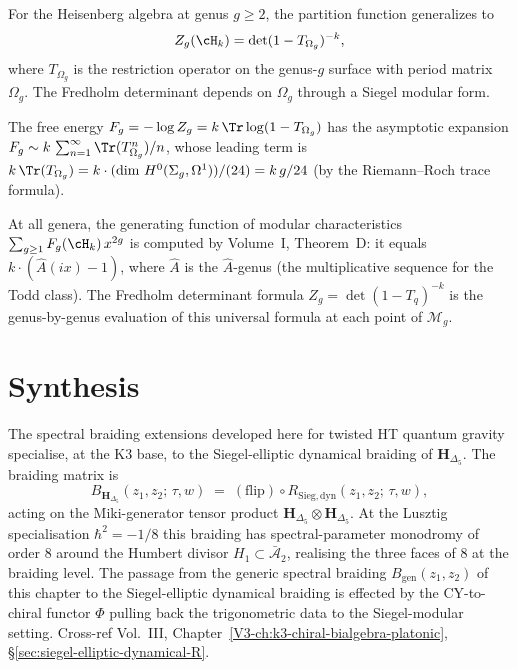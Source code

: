 \begin{remark}
For the Heisenberg algebra at genus $g \ge 2$, the partition function
generalizes to
\[
Z_g(\cH_k) = \det(1 - T_{\Omega_g})^{-k},
\]
where $T_{\Omega_g}$ is the restriction operator on the genus-$g$
surface with period matrix $\Omega_g$. The Fredholm determinant
depends on $\Omega_g$ through a Siegel modular form.

The free energy $F_g = -\log Z_g = k\, \Tr\log(1 - T_{\Omega_g})$
has the asymptotic expansion
$F_g \sim k\, \sum_{n=1}^\infty \Tr(T_{\Omega_g}^n)/n$,
whose leading term is $k\, \Tr(T_{\Omega_g}) = k \cdot
(\text{dim }H^0(\Sigma_g, \Omega^1))/(24) = k\,g/24$
(by the Riemann--Roch trace formula).

At all genera, the generating function of modular characteristics
$\sum_{g \ge 1} F_g(\cH_k)\, x^{2g}$ is computed by
Volume~I, Theorem~D: it equals $k \cdot (\hat{A}(ix) - 1)$,
where $\hat{A}$ is the $\hat{A}$-genus (the multiplicative
sequence for the Todd class). The Fredholm determinant formula
$Z_g = \det(1-T_q)^{-k}$ is the genus-by-genus evaluation of
this universal formula at each point of $\mathcal{M}_g$.
\end{remark}

\section{Synthesis}
\label{sec:specbraid-ext-supplement}

\begin{remark}
\label{rem:specbraid-ext-1}
The spectral braiding extensions developed here for twisted HT quantum
gravity specialise, at the K3 base, to the Siegel-elliptic
dynamical braiding of $\mathbf H_{\Delta_5}$. The braiding matrix is
\[
B_{\mathbf H_{\Delta_5}}(z_1, z_2;\, \tau, w) \;=\; (\mathrm{flip}) \circ R_{\mathrm{Sieg,dyn}}(z_1, z_2;\, \tau, w),
\]
acting on the Miki-generator tensor product
$\mathbf H_{\Delta_5}\otimes\mathbf H_{\Delta_5}$. At the Lusztig
specialisation $\hbar^2 = -1/8$ this braiding has spectral-parameter
monodromy of order $8$ around the Humbert divisor $H_1\subset\bar{\mathcal A}_2$,
realising the three faces of $8$ at the braiding level. The passage from
the generic spectral braiding $B_{\mathrm{gen}}(z_1,z_2)$ of this chapter
to the Siegel-elliptic dynamical braiding is effected by the
CY-to-chiral functor $\Phi$ pulling back the trigonometric data to the
Siegel-modular setting. Cross-ref Vol.~III,
Chapter~\ref{V3-ch:k3-chiral-bialgebra-platonic},
\S\ref{sec:siegel-elliptic-dynamical-R}.
\end{remark}
